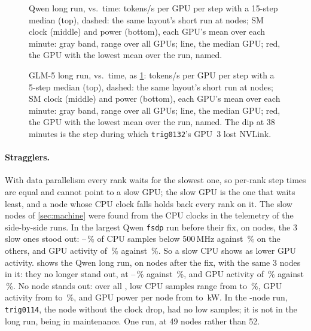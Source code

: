 \begin{figure}[h]
  \centering{}
  \caption{Qwen long run, vs.\ time: tokens/s per GPU per step with a 15-step median (top), dashed: the same layout's short run at \TriLongQRefNodes{} nodes; SM clock (middle) and power (bottom), each GPU's mean over each minute: gray band, range over all GPUs; line, the median GPU; red, the GPU with the lowest mean over the run, named. }
  \label{fig:stability}
\end{figure}

\begin{figure}[h]
  \centering{}
  \caption{GLM-5 long run, vs.\ time, as \cref{fig:stability}: tokens/s per GPU per step with a 5-step median (top), dashed: the same layout's short run at \TriLongGRefNodes{} nodes; SM clock (middle) and power (bottom), each GPU's mean over each minute: gray band, range over all GPUs; line, the median GPU; red, the GPU with the lowest mean over the run, named. The dip at 38 minutes is the step during which \texttt{trig0132}'s GPU~3 lost NVLink. }
  \label{fig:stability_glm}
\end{figure}

\paragraph{Stragglers.} With data parallelism every rank waits for the slowest one, so per-rank step times are equal and cannot point to a slow GPU; the slow GPU is the one that waits least, and a node whose CPU clock falls holds back every rank on it. The slow nodes of \cref{sec:machine} were found from the CPU clocks in the telemetry of the side-by-side runs. In the largest Qwen \texttt{fsdp} run before their fix, on \TriStragBeforeNodes{} nodes, the 3 slow ones stood out: \TriStragBeforeLowLo--\TriStragBeforeLowHi\,\% of CPU samples below 500\,MHz against \TriStragBeforeLowRest\,\% on the others, and GPU activity of \TriStragBeforeUtilSlow\,\% against \TriStragBeforeUtilRest\,\%. So a slow CPU shows as lower GPU activity.  shows the Qwen long run, on \TriStragNodes{} nodes after the fix, with the same 3 nodes in it: they no longer stand out, at \TriStragLowLo--\TriStragLowHi\,\% against \TriStragLowRest\,\%, and GPU activity of \TriStragUtilSlow\,\% against \TriStragUtilRest\,\%. No node stands out: over all \TriStragNodes, low CPU samples range from \TriStragLowAllLo{} to \TriStragLowAllHi\,\%, GPU activity from \TriStragUtilAllLo{} to \TriStragUtilAllHi\,\%, and GPU power per node from \TriStragKwLo{} to \TriStragKwHi\,kW. In the \TriStragBeforeNodes-node run, \texttt{trig0114}, the node without the clock drop, had no low samples; it is not in the long run, being in maintenance. One run, at 49 nodes rather than 52.

